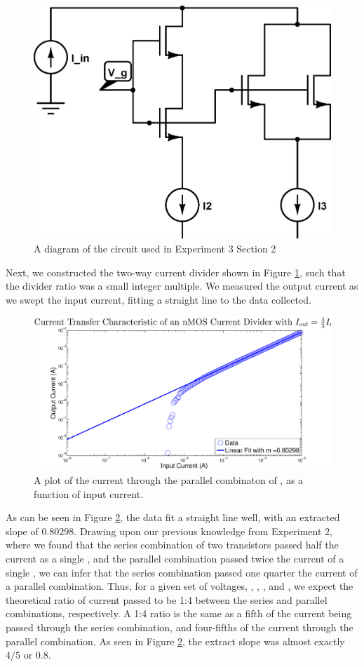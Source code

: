 \begin{figure}[H]
\centering
\includegraphics[width=0.55\linewidth]{../Figures/Experiment3CircuitDiagram2.eps}
\caption{A diagram of the circuit used in Experiment 3 Section 2}
\label{fig:exp3circuit2}
\end{figure}


Next, we constructed the two-way current divider shown in Figure \ref{fig:exp3circuit2}, such that the divider ratio was
a small integer multiple. We measured the output current as we swept the input current, fitting a straight line to the data collected.

\begin{figure}[H]
\centering
\includegraphics[width=\linewidth]{../Figures/Experiment3Figure2.eps}
\caption{A plot of the current through the parallel combinaton of \nMOS, as a function of input current.}
\label{fig:exp3fit2}
\end{figure}
As can be seen in Figure \ref{fig:exp3fit2}, the data fit a straight line well, with an extracted slope of $0.80298$. Drawing upon our previous knowledge from Experiment 2, where we found that the series combination of two \nMOS transistors passed half the current as a single \nMOS, and the parallel combination passed twice the current of a single \nMOS, we can infer that the series combination passed one quarter the current of a parallel combination. 
Thus, for a given set of voltages, \Vg, \Vd, \Vb, \Vd and \Vs, we expect the theoretical ratio of current passed to be 1:4 between the series and parallel combinations, respectively. A 1:4 ratio is the same as a fifth of the current being passed through the series combination, and four-fifths of the current through the parallel combination. As seen in Figure \ref{fig:exp3fit2}, the extract slope was almost exactly $4/5$ or $0.8$.

